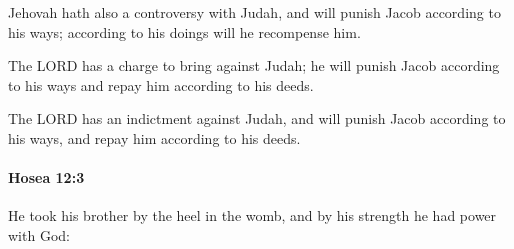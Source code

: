 			\begin{versebox}
					\item[BHS] 
					\item[LXX] 
					\item[ASV] Jehovah hath also a controversy with Judah, and will punish Jacob according to his ways; according to his doings will he recompense him.
					\item[NIV] The LORD has a charge to bring against Judah; he will punish Jacob according to his ways and repay him according to his deeds.
					\item[NRSV] The LORD has an indictment against Judah, and will punish Jacob according to his ways, and repay him according to his deeds.
			\end{versebox}

		\paragraph{Hosea 12:3} %
			\label{HOSEA-12-3}

			He took his brother by the heel in the womb, and by his strength he had power with God:

